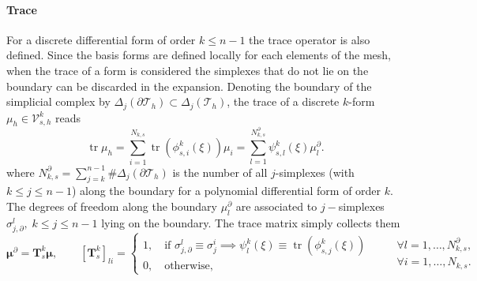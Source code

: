 \documentclass{elsarticle}
\DeclareMathOperator{\tr}{tr}
\begin{document}
\paragraph{Trace}
For a discrete differential form of order $k \le n-1$ the trace operator is also defined. Since the basis forms are defined locally for each elements of the mesh, when the trace of a form is considered the simplexes that do not lie on the boundary can be discarded in the expansion. Denoting the boundary of the simplicial complex by
$\Delta_j(\partial \mathcal{T}_h) \subset \Delta_j(\mathcal{T}_h)$, the trace of a discrete $k$-form $\mu_h \in \mathcal{V}_{s, h}^k$ reads
\begin{equation}
    \tr \mu_h = \sum_{i=1}^{N_{k, s}} \tr(\phi_{s, i}^{k}(\xi)) \mu_i = \sum_{l=1}^{N_{k, s}^\partial} \psi_{s, l}^{k}(\xi) \mu_l^\partial.
\end{equation}
where $N_{k, s}^\partial = \sum_{j=k}^{n-1}\# \Delta_j(\partial \mathcal{T}_h)$ is the number of all $j$-simplexes (with $k\le j\le n-1$) along the boundary for a polynomial differential form of order $k$. The degrees of freedom along the boundary $\mu_l^\partial$ are associated to $j-$simplexes $\sigma_{j, \partial}^l, \; k\le j\le n-1$ lying on the boundary. The trace matrix simply collects them
\begin{equation}\label{eq:alg_trace}
    \bm{\mu}^\partial = \mathbf{T}^k_s \bm{\mu}, \qquad 
    [\mathbf{T}^k_s]_{li} = 
\begin{cases}
    1, \quad \text{if } \sigma_{j, \partial}^l \equiv \sigma_{j}^i \implies \psi_l^{k}(\xi) \equiv \tr(\phi_{s, j}^{k}(\xi))\\
    0, \quad \text{otherwise},
\end{cases} \qquad 
\begin{aligned}
    \forall l = 1, \dots, N_{k, s}^\partial, \\
    \forall i = 1, \dots, N_{k, s}.
\end{aligned}  
\end{equation}
\end{document}
